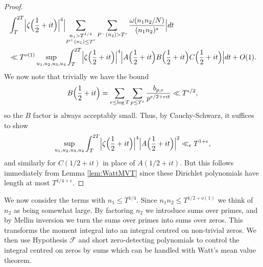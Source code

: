 \documentclass[12pt]{amsart}
\theoremstyle{plain}
\theoremstyle{definition}
\theoremstyle{remark}
\begin{document}
\begin{proof}
\begin{align*}
&\int_T^{2T} \Bigl| \zeta \Bigl(\frac{1}{2}+it \Bigr) \Bigr|^{4}\Bigl|\sum_{\substack{ n_1>T^{1/4}\\ P^+(n_1)\le T^\epsilon}}\sum_{P^-(n_2)>T^\epsilon}\frac{\omega(n_1n_2/N)}{(n_1n_2)^s} \Bigr| dt \\
&\ll T^{o(1)}\sup_{u_1,u_2,u_3,u_4}\int_T^{2T} \Bigl| \zeta \Bigl(\frac{1}{2}+it \Bigr) \Bigr|^{4}\Bigl|A\Bigl(\frac{1}{2}+it\Bigr)B\Bigl(\frac{1}{2}+it\Bigr)C\Bigl(\frac{1}{2}+it\Bigr)\Bigr| dt +O(1).
\end{align*}
We now note that trivially we have the bound
\[
B\Bigl(\frac{1}{2}+it\Bigr)=\sum_{e\le \log{T}}\sum_{p\le T^\epsilon}\frac{b_{p,e}}{p^{e/2+eit}}\ll T^{\epsilon/2},
\]
so the $B$ factor is always acceptably small. Thus, by Cauchy-Schwarz, it suffices to show 
\[
\sup_{u_1,u_2,u_3,u_4}\int_T^{2T} \Bigl| \zeta \Bigl(\frac{1}{2}+it \Bigr) \Bigr|^{4}\Bigl|A\Bigl(\frac{1}{2}+it\Bigr)\Bigr|^{2}\ll_\epsilon T^{1+\epsilon},
\]
and similarly for $C(1/2+it)$ in place of $A(1/2+it)$. But this follows immediately from Lemma \ref{lem:WattMVT} since these Dirichlet polynomials have length at most $T^{1/4+\epsilon}$.
\end{proof}
%
%
%
%
We now consider the terms with $n_1\le T^{1/4}$. Since $n_1n_2 \leq T^{1/2+o(1)}$ we think of $n_2$ as being somewhat large. By factoring $n_2$ we introduce sums over primes, and by Mellin inversion we turn the sums over primes into sums over zeros. This transforms the moment integral into an integral centred on non-trivial zeros. We then use Hypothesis $\mathcal{F}$ and short zero-detecting polynomials to control the integral centred on zeros by sums which can be handled with Watt's mean value theorem.
\end{document}
